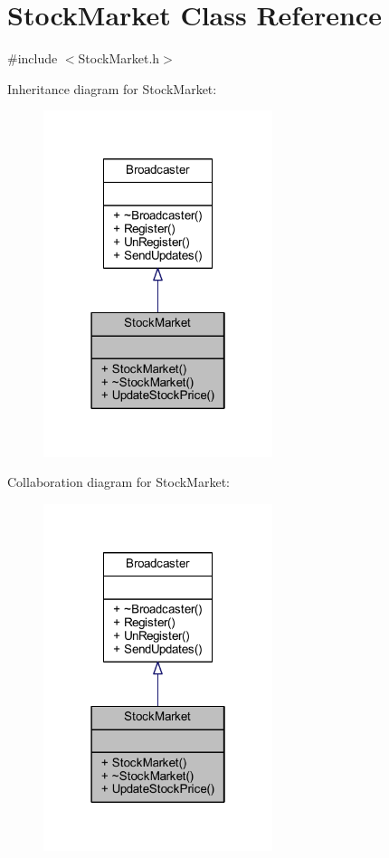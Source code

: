\hypertarget{class_stock_market}{}\section{Stock\+Market Class Reference}
\label{class_stock_market}


{\ttfamily \#include $<$Stock\+Market.\+h$>$}



Inheritance diagram for Stock\+Market\+:
\nopagebreak
\begin{figure}[H]
\begin{center}
\leavevmode
\includegraphics[width=190pt]{class_stock_market__inherit__graph}
\end{center}
\end{figure}


Collaboration diagram for Stock\+Market\+:
\nopagebreak
\begin{figure}[H]
\begin{center}
\leavevmode
\includegraphics[width=190pt]{class_stock_market__coll__graph}
\end{center}
\end{figure}
